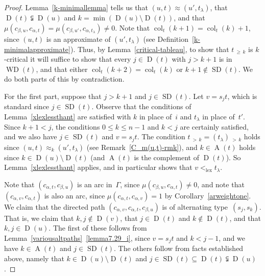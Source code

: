 \documentclass[ALCO,ThmDefs,Unicode,epreuves]{cedram}
\DeclareMathOperator{\lex}{lex}
\DeclareMathOperator{\col}{col}
\newcommand{\morethan}[2]{#1\,{_{>\,#2}}}
\newcommand{\Morethan}[2]{#1\,{_{\geqslant\,#2}}}
\DeclareMathOperator{\SD}{SD}
\DeclareMathOperator{\WD}{WD}
\DeclareMathOperator{\D}{D}
\DeclareMathOperator{\A}{A}
\begin{document}
\begin{proof}
Lemma~\ref{k-minimallemma} tells us that $(u,t)\approx (u',t_\lambda)$, that
$\D(t)\subsetneqq\D(u)$ and $k=\min(\D(u)\setminus\D(t))$,
and that $\mu(c_{\beta,u},c_{\alpha,t})=\mu(c_{\beta,u'},c_{\alpha,t_\lambda})\neq 0$.
Note that $\col_t(k+1)=\col_t(k)+1$, since $(u,t)$ is an approximate of
$(u',t_\lambda)$ (see Definition~\ref{k-minimalapproximate}). Thus, by Lemma~\ref{critical-tableau},
to show that $\Morethan tk$
is $k$-critical it will suffice to show that every $j\in\D(t)$ with
$j>k+1$ is in $\WD(t)$, and that either $\col_t(k+2)=\col_t(k)$
or $k+1\notin\SD(t)$. We do both parts of this by contradiction.

For the first part, suppose that $j>k+1$ and $j\in\SD(t)$. Let $v=s_jt$,
which is standard since $j\in\SD(t)$. Observe that the conditions of
Lemma~\ref{xlexlessthant} are satisfied with $k$ in place of~$i$
and $t_\lambda$ in place of~$t'$. Since $k+1<j$, the conditions
$0\leqslant k\leqslant n-1$ and $k<j$ are certainly satisfied, and
we also have $j\in\SD(t)$ and $v=s_jt$. The condition
$\morethan {\morethan tk=(t_\lambda)}k$ holds since $(u,t)\approx_k(u',t_\lambda)$
(see Remark~\ref{C_m(u,t)-rmk}), and $k\in\A(t)$ holds since
$k\in\D(u)\setminus\D(t)$ (and $\A(t)$ is the complement of $\D(t)$).
So Lemma~\ref{xlexlessthant} applies, and in particular shows
that $v<_{\lex}t_\lambda$.

Note that $(c_{\alpha,t},c_{\beta,u})$ is an arc in~$\Gamma$, since
$\mu(c_{\beta,u},c_{\alpha,t})\neq 0$, and note that $(c_{\alpha,v},c_{\alpha,t})$
is also an arc, since $\mu(c_{\alpha,t},c_{\alpha,v})=1$ by Corollary~\ref{arweightone}.
We claim that the directed path $(c_{\alpha,v},c_{\alpha,t},c_{\beta,u})$
is of alternating type~$(s_j,s_k)$. That is, we claim that $k,j\notin\D(v)$,
that $j\in\D(t)$ and $k\notin\D(t)$, and that $k,j\in\D(u)$.
The first of these follows from Lemma~\ref{variousaltpaths}~\ref{lemma7.29_i}, since
$v=s_jt$ and $k<j-1$, and we have $k\in\A(t)$ and $j\in\SD(t)$.
The others follow from facts established above, namely that $k\in\D(u)\setminus\D(t)$
and $j\in\SD(t)\subseteq\D(t)\subsetneqq\D(u)$.


\end{proof}
\end{document}
